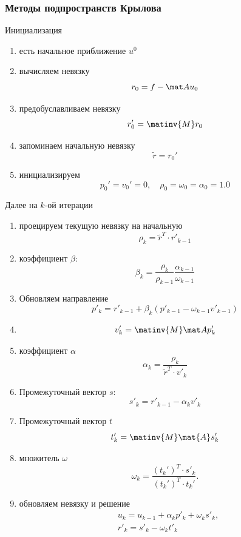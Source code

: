 \subsubsection{Методы подпространств Крылова}

\label{sec:bicgstab}

Инициализация
\begin{enumerate}
\item есть начальное приближение $u^0$
\item вычисляем невязку
$$r_0 = f - \mat A u_0$$
\item предобуславливаем невязку
$$r_0' = \matinv{M}r_0$$
\item запоминаем начальную невязку
$$\tilde r = r_0'$$
\item инициализируем
$$p_0' = v_0' = 0, \quad \rho_0 = \omega_0 = \alpha_0 = 1.0$$
\end{enumerate}

Далее на $k$-ой итерации

\begin{enumerate}
\item проецируем текущую невязку на начальную
$$\rho_k = \tilde r^T \cdot r'_{k-1}$$
\item коэффициент $\beta$:
$$\beta_k = \frac{\rho_k}{\rho_{k-1}} \frac{\alpha_{k-1}}{\omega_{k-1}}$$
\item Обновляем направление
$$p'_k = r'_{k-1} + \beta_k \left( p'_{k-1} - \omega_{k-1} v'_{k-1} \right)$$
\item
$$v_k'=\matinv{M}\mat A p_k'$$
\item коэффициент $\alpha$
$$\alpha_k = \frac{\rho_k}{\tilde r^T \cdot v'_k}$$
\item Промежуточный вектор $s$:
$$s'_k =  r'_{k-1} - \alpha_k v'_k$$
\item Промежуточный вектор $t$
$$t'_k = \matinv{M}\mat{A}s_k'$$
\item множитель $\omega$
$$\omega_k = \frac{ (t_k')^T \cdot s'_k} { (t_k')^T \cdot t_k' }.$$
\item обновляем невязку и решение
\begin{equation}
\label{eq:schwarz_bicgstab}
\begin{aligned}
& u_k = u_{k-1} + \alpha_k p'_k + \omega_k s'_k, \\
& r'_k = s'_k - \omega_k t'_k
\end{aligned}
\end{equation}
\end{enumerate}

